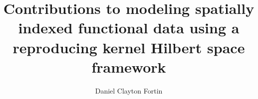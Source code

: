 
\title{Contributions to modeling spatially indexed functional data using a reproducing kernel Hilbert space framework}
\author{Daniel Clayton Fortin}
\notice
\maketitle
